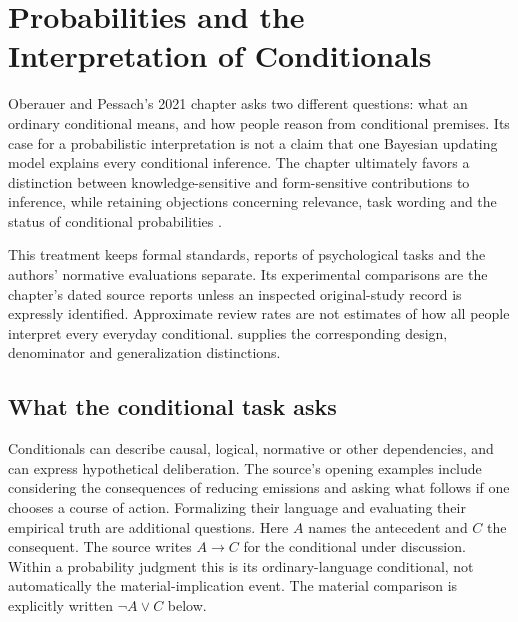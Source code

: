 \chapter{Probabilities and the Interpretation of Conditionals}
\label{sec:p19-rationality-4-6}

Oberauer and Pessach's 2021 chapter asks two different questions: what an
ordinary conditional means, and how people reason from conditional premises.
Its case for a probabilistic interpretation is not a claim that one Bayesian
updating model explains every conditional inference. The chapter ultimately
favors a distinction between knowledge-sensitive and form-sensitive
contributions to inference, while retaining objections concerning relevance,
task wording and the status of conditional probabilities
\cite[pp.~295--304]{OberauerPessach2021ProbabilitiesConditionals}.

This treatment keeps formal standards, reports of psychological tasks and
the authors' normative evaluations separate. Its experimental comparisons
are the chapter's dated source reports unless an inspected original-study
record is expressly identified. Approximate review rates are not estimates
of how all people interpret every everyday conditional.
 supplies the corresponding design,
denominator and generalization distinctions.

\section{What the conditional task asks}
\label{sec:p19-rat46-tasks}

Conditionals can describe causal, logical, normative or other dependencies,
and can express hypothetical deliberation. The source's opening examples
include considering the consequences of reducing emissions and asking what
follows if one chooses a course of action. Formalizing their language and
evaluating their empirical truth are additional questions. Here \(A\)
names the antecedent and \(C\) the consequent. The source writes
\(A\to C\) for the conditional under discussion. Within a probability
judgment this is its ordinary-language conditional, not automatically the
material-implication event. The material comparison is explicitly written
\(\neg A\lor C\) below.

